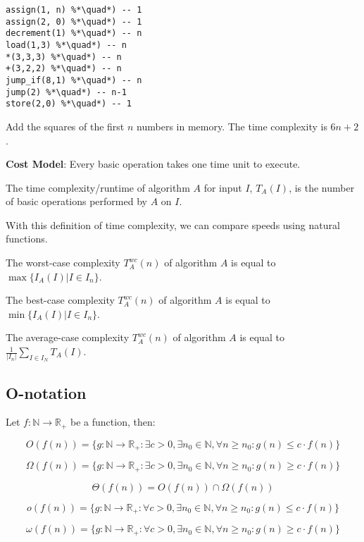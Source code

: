 \begin{algorithm}[h]
\begin{lstlisting}
assign(1, n) %*\quad*) -- 1
assign(2, 0) %*\quad*) -- 1
decrement(1) %*\quad*) -- n
load(1,3) %*\quad*) -- n
*(3,3,3) %*\quad*) -- n
+(3,2,2) %*\quad*) -- n
jump_if(8,1) %*\quad*) -- n
jump(2) %*\quad*) -- n-1
store(2,0) %*\quad*) -- 1
\end{lstlisting}
\caption{Add the squares of the first $n$ numbers in memory. The time complexity is $6n +2$.}
\end{algorithm}

\textbf{Cost Model}: Every basic operation takes one time unit to execute.

\begin{mydefinition}
The time complexity/runtime of algorithm $A$ for input $I$, $T_A(I)$, is the number of basic operations performed by $A$ on $I$.
\end{mydefinition}

With this definition of time complexity, we can compare speeds using natural functions.

\begin{mydefinition}
The worst-case complexity $T_A^{wc}(n)$ of algorithm $A$ is equal to $\max\{I_A(I) | I \in I_n\}$.
\end{mydefinition}

\begin{mydefinition}
The best-case complexity $T_A^{wc}(n)$ of algorithm $A$ is equal to $\min\{I_A(I) | I \in I_n\}$.
\end{mydefinition}

\begin{mydefinition}
The average-case complexity $T_A^{wc}(n)$ of algorithm $A$ is equal to $\frac{1}{|I_n|} \sum\limits_{I \in I_N} T_A(I)$.
\end{mydefinition}

\subsection{O-notation}

\begin{mydefinition}
Let $f: \mathbb{N} \rightarrow \mathbb{R}_+$ be a function, then:

$$O(f(n)) = \{g: \mathbb{N}\rightarrow \mathbb{R}_+: \exists c>0, \exists n_0 \in \mathbb{N}, \forall n \ge n_0: g(n) \le c \cdot f(n)\}$$

$$\Omega(f(n)) = \{g: \mathbb{N}\rightarrow \mathbb{R}_+: \exists c>0, \exists n_0 \in \mathbb{N}, \forall n \ge n_0: g(n) \ge c \cdot f(n)\}$$

$$\Theta(f(n)) = O(f(n))\cap \Omega(f(n))$$

$$o(f(n)) = \{g: \mathbb{N}\rightarrow \mathbb{R}_+: \forall c>0, \exists n_0 \in \mathbb{N}, \forall n \ge n_0: g(n) \le c \cdot f(n)\}$$

$$\omega(f(n)) = \{g: \mathbb{N}\rightarrow \mathbb{R}_+: \forall c>0, \exists n_0 \in \mathbb{N}, \forall n \ge n_0: g(n) \ge c \cdot f(n)\}$$

\end{mydefinition}

